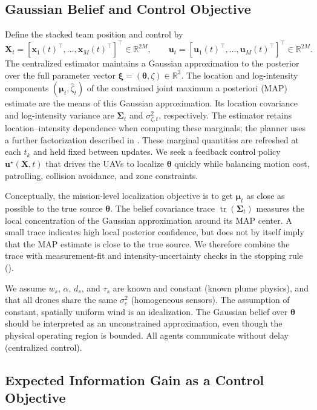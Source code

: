 \documentclass{article}
\DeclareMathOperator{\tr}{tr}
\newcommand{\R}{\mathbb{R}}
\newcommand{\bs}[1]{\boldsymbol{#1}}
\newcommand{\x}{\mathbf{x}}
\renewcommand{\u}{\mathbf{u}}
\newcommand{\bX}{\mathbf{X}}
\begin{document}
\subsection{Gaussian Belief and Control Objective}
\label{sec:belief_objective}
Define the stacked team position and control by
\begin{equation}
\bX_t=[\x_1(t)^\top,\dots,\x_M(t)^\top]^\top\in\R^{2M},
\qquad
\u_t=[\u_1(t)^\top,\dots,\u_M(t)^\top]^\top\in\R^{2M}.
\end{equation}
The centralized estimator maintains a Gaussian approximation to the posterior over the full parameter vector $\bs\xi=(\bs\theta,\zeta)\in\R^3$.
The location and log-intensity components $(\bs\mu_t,\hat\zeta_t)$ of the constrained joint maximum a posteriori (MAP) estimate are the means of this Gaussian approximation.
Its location covariance and log-intensity variance are $\bs\Sigma_t$ and $\sigma_{\zeta,t}^2$, respectively.
The estimator retains location--intensity dependence when computing these marginals; the planner uses a further factorization described in .
These marginal quantities are refreshed at each $t_k$ and held fixed between updates.
We seek a feedback control policy $\u^\star(\bX,t)$ that drives the UAVs to localize $\bs\theta$ quickly while balancing motion cost, patrolling, collision avoidance, and zone constraints.


Conceptually, the mission-level localization objective is to get $\bs\mu_t$ as close as possible to the true source $\bs\theta$.
The belief covariance trace $\tr(\bs\Sigma_t)$ measures the local concentration of the Gaussian approximation around its MAP center.
A small trace indicates high local posterior confidence, but does not by itself imply that the MAP estimate is close to the true source.
We therefore combine the trace with measurement-fit and intensity-uncertainty checks in the stopping rule ().

We assume $w_s$, $\alpha$, $d_s$, and $\tau_s$ are known and constant (known plume physics), and that all drones share the same $\sigma_e^2$ (homogeneous sensors).
The assumption of constant, spatially uniform wind is an idealization.
The Gaussian belief over $\bs\theta$ should be interpreted as an unconstrained approximation, even though the physical operating region is bounded.
All agents communicate without delay (centralized control).

\subsection{Expected Information Gain as a Control Objective}
\label{sec:eig_objective}
\end{document}
